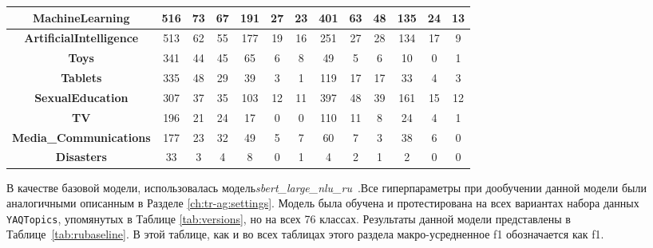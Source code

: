 \begin{table}[t]
{\begin{tabular}{|c||c|c|c||c|c|c||c|c|c||c|c|c|}
\textbf{MachineLearning} & 516 & 73 & 67 & 191 & 27 & 23 & 401 & 63 & 48 & 135 & 24 & 13\\ \hline
\textbf{ArtificialIntelligence} & 513 & 62 & 55 & 177 & 19 & 16 & 251 & 27 & 28 & 134 & 17 & 9\\ \hline
\textbf{Toys} & 341 & 44 & 45 & 65 & 6 & 8 & 49 & 5 & 6 & 10 & 0 & 1\\ \hline
\textbf{Tablets} & 335 & 48 & 29 & 39 & 3 & 1 & 119 & 17 & 17 & 33 & 4 & 3\\ \hline
\textbf{SexualEducation} & 307 & 37 & 35 & 103 & 12 & 11 & 397 & 48 & 39 & 161 & 15 & 12\\ \hline
\textbf{TV} & 196 & 21 & 24 & 17 & 0 & 0 & 110 & 11 & 8 & 24 & 4 & 1\\ \hline
\textbf{Media\_Communications} & 177 & 23 & 32 & 49 & 5 & 7 & 60 & 7 & 3 & 38 & 6 & 0\\ \hline
\textbf{Disasters} & 33 & 3 & 4 & 8 & 0 & 1 & 4 & 2 & 1 & 2 & 0 & 0\\ \hline
\end{tabular}
}
\end{table}
В качестве базовой модели, использовалась модель\textit{sbert\_large\_nlu\_ru}~\cite{sbert_large_nlu_ru}.Все гиперпараметры при дообучении данной модели были аналогичными описанным в Разделе \ref{ch:tr-ag:settings}. Модель была обучена и протестирована на всех вариантах набора данных \texttt{YAQTopics}, упомянутых в Таблице \ref{tab:versions}, но на всех 76 классах. Результаты данной модели представлены в Таблице~\ref{tab:rubaseline}. В этой таблице, как и во всех таблицах этого раздела макро-усредненное f1 обозначается как f1.

